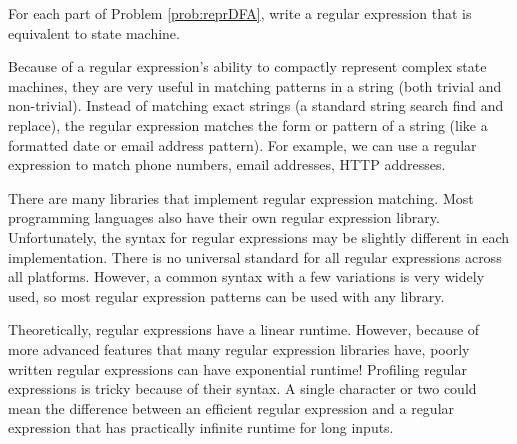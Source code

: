\begin{problem}
For each part of Problem \ref{prob:reprDFA}, write a  regular expression that is equivalent to state machine.
\label{prob:equiv_regex}
\end{problem}

Because of a regular expression's ability to compactly represent complex state machines, they are very useful in matching patterns in a string (both trivial and non-trivial).
Instead of matching exact strings (a standard string search find and replace), the regular expression matches the form or pattern of a string (like a formatted date or email address pattern).
For example, we can use a regular expression to match phone numbers, email addresses, HTTP addresses.

There are many libraries that implement regular expression matching.
Most programming languages also have their own regular expression library.
Unfortunately, the syntax for regular expressions may be slightly different in each implementation. 
There is no universal standard for all regular expressions across all platforms. 
However, a common syntax with a few variations is very widely used, so most regular expression patterns can be used with any library.

\begin{warn}
Theoretically, regular expressions have a linear runtime.
However, because of more advanced features that many regular expression libraries have, poorly written regular expressions can have exponential runtime!
Profiling regular expressions is tricky because of their syntax.
A single character or two  could mean the difference between an efficient regular expression and a regular expression that has practically infinite runtime for long inputs.
\end{warn}

